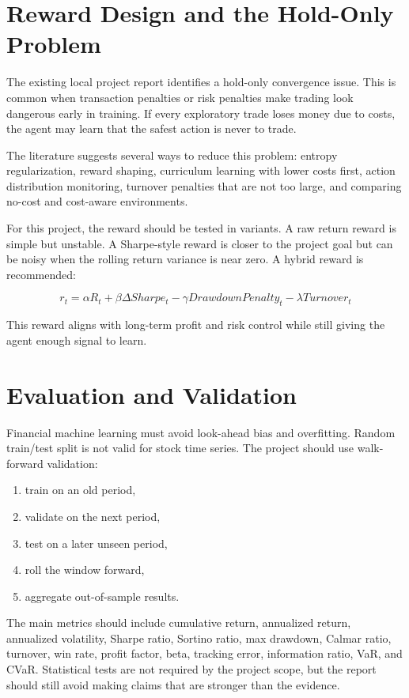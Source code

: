 \documentclass[11pt]{article}
\begin{document}
\section{Reward Design and the Hold-Only Problem}
The existing local project report identifies a hold-only convergence issue. This is common when transaction penalties or risk penalties make trading look dangerous early in training. If every exploratory trade loses money due to costs, the agent may learn that the safest action is never to trade.

The literature suggests several ways to reduce this problem: entropy regularization, reward shaping, curriculum learning with lower costs first, action distribution monitoring, turnover penalties that are not too large, and comparing no-cost and cost-aware environments.

For this project, the reward should be tested in variants. A raw return reward is simple but unstable. A Sharpe-style reward is closer to the project goal but can be noisy when the rolling return variance is near zero. A hybrid reward is recommended:

\[
r_t = \alpha R_t + \beta \Delta Sharpe_t - \gamma DrawdownPenalty_t - \lambda Turnover_t
\]

This reward aligns with long-term profit and risk control while still giving the agent enough signal to learn.

\section{Evaluation and Validation}
Financial machine learning must avoid look-ahead bias and overfitting. Random train/test split is not valid for stock time series. The project should use walk-forward validation:

\begin{enumerate}
\item train on an old period,
\item validate on the next period,
\item test on a later unseen period,
\item roll the window forward,
\item aggregate out-of-sample results.
\end{enumerate}

The main metrics should include cumulative return, annualized return, annualized volatility, Sharpe ratio, Sortino ratio, max drawdown, Calmar ratio, turnover, win rate, profit factor, beta, tracking error, information ratio, VaR, and CVaR. Statistical tests are not required by the project scope, but the report should still avoid making claims that are stronger than the evidence.
\end{document}
